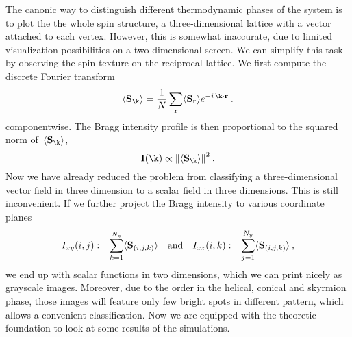 The canonic way to distinguish different thermodynamic phases of the system is
to plot the the whole spin structure, \ie{} a three-dimensional lattice with a
vector attached to each vertex. However, this is somewhat inaccurate, due to
limited visualization possibilities on a two-dimensional screen. We can simplify
this task by observing the spin texture on the reciprocal lattice. We first
compute the discrete Fourier transform
%
\begin{equation}
  \avg{\S_{\k}} = \frac{1}{N} \sum_{\r} \avg{\S_{\r}} e^{- i\, \k \cdot \r}\:.
\end{equation}
%
componentwise. The Bragg intensity profile is then proportional to the squared
norm of~$\avg{\S_{\k}}$,
%
\begin{equation}
  \mathbf{I}(\k) \propto \norm{\avg{\S_{\k}}}^2 \:.
\end{equation}
%
Now we have already reduced the problem from classifying a three-dimensional
vector field in three dimension to a scalar field in three dimensions. This is
still inconvenient. If we further project the Bragg intensity to various
coordinate planes
%
\begin{equation}
  I_{xy} (i,j) := \sum_{k = 1}^{N_z} \langle \mathbf{S}_{(i,j,k)} \rangle \quad\text{and}\quad
  I_{xz} (i,k) := \sum_{j = 1}^{N_y} \langle \mathbf{S}_{(i,j,k)} \rangle\:,
\end{equation}
%
we end up with scalar functions in two dimensions, which we can print nicely as
grayscale images. Moreover, due to the order in the helical, conical and
skyrmion phase, those images will feature only few bright spots in different
pattern, which allows a convenient classification. Now we are equipped with the
theoretic foundation to look at some results of the simulations.

